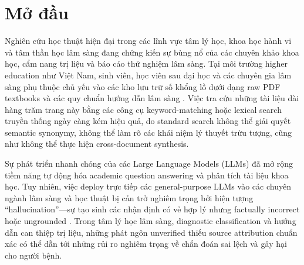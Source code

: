 \documentclass[10pt]{SPIIRAS_Proceedings}
\begin{document}
\section{Mở đầu}\label{sec:introduction}
Nghiên cứu học thuật hiện đại trong các lĩnh vực tâm lý học, khoa học hành vi và tâm thần học lâm sàng đang chứng kiến sự bùng nổ của các chuyên khảo khoa học, cẩm nang trị liệu và báo cáo thử nghiệm lâm sàng. Tại môi trường higher education như Việt Nam, sinh viên, học viên sau đại học và các chuyên gia lâm sàng phụ thuộc chủ yếu vào các kho lưu trữ số khổng lồ dưới dạng raw PDF textbooks và các quy chuẩn hướng dẫn lâm sàng \cite{iancarelli2025affective}. Việc tra cứu những tài liệu dài hàng trăm trang này bằng các công cụ keyword-matching hoặc lexical search truyền thống ngày càng kém hiệu quả, do standard search không thể giải quyết semantic synonymy, không thể làm rõ các khái niệm lý thuyết trừu tượng, cũng như không thể thực hiện cross-document synthesis.

Sự phát triển nhanh chóng của các Large Language Models (LLMs) đã mở rộng tiềm năng tự động hóa academic question answering và phân tích tài liệu khoa học. Tuy nhiên, việc deploy trực tiếp các general-purpose LLMs vào các chuyên ngành lâm sàng và học thuật bị cản trở nghiêm trọng bởi hiện tượng ``hallucination''---sự tạo sinh các nhận định có vẻ hợp lý nhưng factually incorrect hoặc ungrounded \cite{min2023factscore, lu2026mhb}. Trong tâm lý học lâm sàng, diagnostic classification và hướng dẫn can thiệp trị liệu, những phát ngôn unverified thiếu source attribution chuẩn xác có thể dẫn tới những rủi ro nghiêm trọng về chẩn đoán sai lệch và gây hại cho người bệnh.
\end{document}
